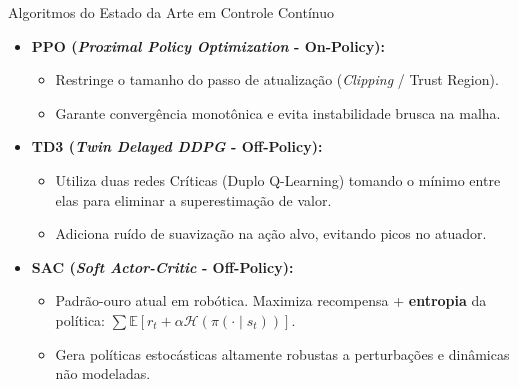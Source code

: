\documentclass[11pt, aspectratio=169]{beamer}
\begin{document}
\begin{frame}{Algoritmos do Estado da Arte em Controle Contínuo}
    \begin{itemize}
        \item \textbf{PPO (\textit{Proximal Policy Optimization} - On-Policy):}
        \begin{itemize}
            \item Restringe o tamanho do passo de atualização (\textit{Clipping} / Trust Region).
            \item Garante convergência monotônica e evita instabilidade brusca na malha.
        \end{itemize}
        \vspace{0.25cm}
        \item \textbf{TD3 (\textit{Twin Delayed DDPG} - Off-Policy):}
        \begin{itemize}
            \item Utiliza duas redes Críticas (Duplo Q-Learning) tomando o mínimo entre elas para eliminar a superestimação de valor.
            \item Adiciona ruído de suavização na ação alvo, evitando picos no atuador.
        \end{itemize}
        \vspace{0.25cm}
        \item \textbf{SAC (\textit{Soft Actor-Critic} - Off-Policy):}
        \begin{itemize}
            \item Padrão-ouro atual em robótica. Maximiza recompensa + \textbf{entropia} da política: $\sum \mathbb{E}[r_t + \alpha \mathcal{H}(\pi(\cdot \mid s_t))]$.
            \item Gera políticas estocásticas altamente robustas a perturbações e dinâmicas não modeladas.
        \end{itemize}
    \end{itemize}
\end{frame}
\end{document}
